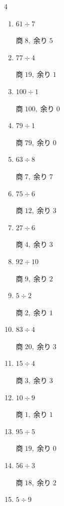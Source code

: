 \begin{multicols}{4}
\begin{enumerate}
        $商\; 18,\; 余り\; 2$

  \item $61 \div 7$

        $商\; 8,\; 余り\; 5$

  \item $77 \div 4$

        $商\; 19,\; 余り\; 1$

  \item $100 \div 1$

        $商\; 100,\; 余り\; 0$

  \item $79 \div 1$

        $商\; 79,\; 余り\; 0$

  \item $63 \div 8$

        $商\; 7,\; 余り\; 7$

  \item $75 \div 6$

        $商\; 12,\; 余り\; 3$

  \item $27 \div 6$

        $商\; 4,\; 余り\; 3$

  \item $92 \div 10$

        $商\; 9,\; 余り\; 2$

  \item $5 \div 2$

        $商\; 2,\; 余り\; 1$

  \item $83 \div 4$

        $商\; 20,\; 余り\; 3$

  \item $15 \div 4$

        $商\; 3,\; 余り\; 3$

  \item $10 \div 9$

        $商\; 1,\; 余り\; 1$

\columnbreak %

  \item $95 \div 5$

        $商\; 19,\; 余り\; 0$

  \item $56 \div 3$

        $商\; 18,\; 余り\; 2$

  \item $5 \div 9$


\end{enumerate}
\end{multicols}
